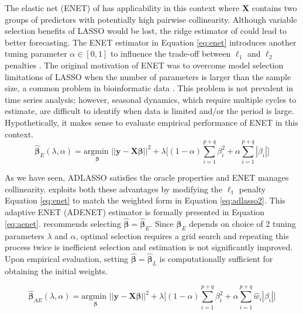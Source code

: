 The elastic net (ENET) of \cite{Zou2005} has applicability in this context where $\bm{X}$ contains two groups of predictors with potentially high pairwise collinearity. Although variable selection benefits of LASSO would be lost, the ridge estimator of \citep{Hoerl1970} could lead to better forecasting. The ENET estimator in Equation \ref{eq:enet}  introduces another tuning parameter $\alpha\in[0,1]$ to influence the trade-off between $\ell_1$ and $\ell_2$ penalties \citep{DeMol2009}. The original motivation of ENET was to overcome model selection limitations of LASSO when the number of parameters is larger than the sample size, a common problem in bioinformatic data \citep{Zou2005}. This problem is not prevalent in time series analysis; however, seasonal dynamics, which require multiple cycles to estimate, are difficult to identify when data is limited and/or the period is large. Hypothetically, it makes sense to evaluate empirical performance of ENET in this context.
\begin{equation}
\label{eq:enet}
\hat{\bm{\beta}}_{E} (\lambda,\alpha)= \underset{\bm{\beta}}{\textrm{argmin }}  ||\bm{y}-\bm{X}\bm{\beta}||^2 + \lambda\bigg[ (1-\alpha) \sum\limits_{i=1}^{p+q} \beta^2_i+ \alpha\sum\limits_{i=1}^{p+q} |\beta_i| \bigg]
\end{equation}

As we have seen, ADLASSO satisfies the oracle properties \citep{Zou2006} and ENET \citep{Zou2005} manages collinearity. \cite{Zou2009} exploits both these advantages by modifying the $\ell_1$ penalty Equation \ref{eq:enet} to match the weighted form in Equation \ref{eq:adlasso2}. This adaptive ENET (ADENET) estimator is formally presented in Equation \ref{eq:aenet}. \cite{Zou2009} recommends selecting $\hat{\bm{\beta}}=\hat{\bm{\beta}}_{E}$. Since $\hat{\bm{\beta}}_{E}$ depends on choice of 2 tuning parameters $\lambda$ and $\alpha$, optimal selection requires a grid search and repeating this process twice is inefficient selection and estimation is not significantly improved. Upon empirical evaluation, setting $\hat{\bm{\beta}}=\hat{\bm{\beta}}_{L}$ is computationally sufficient for obtaining the initial weights.

\begin{equation}
\label{eq:aenet}
\hat{\bm{\beta}}_{AE} (\lambda,\alpha)= \underset{\bm{\beta}}{\textrm{argmin }}  ||\bm{y}-\bm{X}\bm{\beta}||^2 + \lambda\bigg[ (1-\alpha)  \sum\limits_{i=1}^{p+q} \beta^2_i+ \alpha\sum\limits_{i=1}^{p+q} \hat{w}_{i}|\beta_i| \bigg]
\end{equation}


